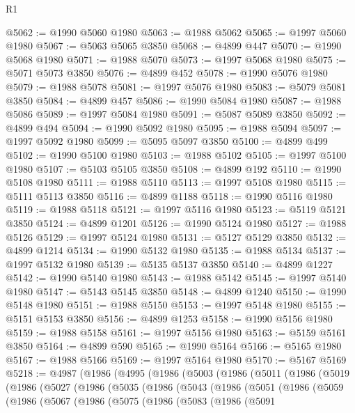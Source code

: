 \begin{lexlean}{R1}
\begin{coremodule}
@5062 := @1990 @5060 @1980
@5063 := @1988 @5062
@5065 := @1997 @5060 @1980
@5067 := @5063 @5065 @3850
@5068 := @4899 @447
@5070 := @1990 @5068 @1980
@5071 := @1988 @5070
@5073 := @1997 @5068 @1980
@5075 := @5071 @5073 @3850
@5076 := @4899 @452
@5078 := @1990 @5076 @1980
@5079 := @1988 @5078
@5081 := @1997 @5076 @1980
@5083 := @5079 @5081 @3850
@5084 := @4899 @457
@5086 := @1990 @5084 @1980
@5087 := @1988 @5086
@5089 := @1997 @5084 @1980
@5091 := @5087 @5089 @3850
@5092 := @4899 @494
@5094 := @1990 @5092 @1980
@5095 := @1988 @5094
@5097 := @1997 @5092 @1980
@5099 := @5095 @5097 @3850
@5100 := @4899 @499
@5102 := @1990 @5100 @1980
@5103 := @1988 @5102
@5105 := @1997 @5100 @1980
@5107 := @5103 @5105 @3850
@5108 := @4899 @192
@5110 := @1990 @5108 @1980
@5111 := @1988 @5110
@5113 := @1997 @5108 @1980
@5115 := @5111 @5113 @3850
@5116 := @4899 @1188
@5118 := @1990 @5116 @1980
@5119 := @1988 @5118
@5121 := @1997 @5116 @1980
@5123 := @5119 @5121 @3850
@5124 := @4899 @1201
@5126 := @1990 @5124 @1980
@5127 := @1988 @5126
@5129 := @1997 @5124 @1980
@5131 := @5127 @5129 @3850
@5132 := @4899 @1214
@5134 := @1990 @5132 @1980
@5135 := @1988 @5134
@5137 := @1997 @5132 @1980
@5139 := @5135 @5137 @3850
@5140 := @4899 @1227
@5142 := @1990 @5140 @1980
@5143 := @1988 @5142
@5145 := @1997 @5140 @1980
@5147 := @5143 @5145 @3850
@5148 := @4899 @1240
@5150 := @1990 @5148 @1980
@5151 := @1988 @5150
@5153 := @1997 @5148 @1980
@5155 := @5151 @5153 @3850
@5156 := @4899 @1253
@5158 := @1990 @5156 @1980
@5159 := @1988 @5158
@5161 := @1997 @5156 @1980
@5163 := @5159 @5161 @3850
@5164 := @4899 @590
@5165 := @1990 @5164
@5166 := @5165 @1980
@5167 := @1988 @5166
@5169 := @1997 @5164 @1980
@5170 := @5167 @5169
@5218 := @4987
    (@1986
      (@4995
        (@1986
          (@5003
            (@1986
              (@5011
                (@1986
                  (@5019
                    (@1986
                      (@5027
                        (@1986
                          (@5035
                            (@1986
                              (@5043
                                (@1986
                                  (@5051
                                    (@1986
                                      (@5059
                                        (@1986
                                          (@5067
                                            (@1986
                                              (@5075
                                                (@1986
                                                  (@5083
                                                    (@1986
                                                      (@5091

\end{coremodule}
\end{lexlean}
